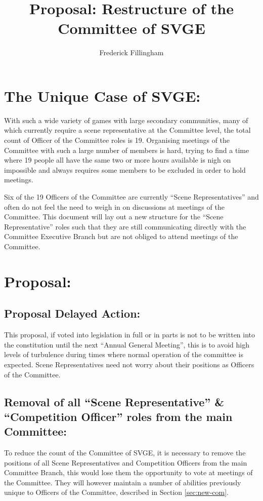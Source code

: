 \documentclass[10pt, a4paper]{article}
\title{Proposal: Restructure of the Committee of SVGE}
\author{Frederick Fillingham}
\begin{document}
\maketitle

\section{The Unique Case of SVGE:}
With such a wide variety of games with large secondary communities, many of which currently require a scene representative at the Committee level, the total count of Officer of the Committee roles is 19. Organising meetings of the Committee with such a large number of members is hard, trying to find a time where 19 people all have the same two or more hours available is nigh on impossible and always requires some members to be excluded in order to hold meetings. 

Six of the 19 Officers of the Committee are currently ``Scene Representatives'' and often do not feel the need to weigh in on discussions at meetings of the Committee. This document will lay out a new structure for the ``Scene Representative'' roles such that they are still communicating directly with the Committee Executive Branch but are not obliged to attend meetings of the Committee.


\section{Proposal:}

\subsection{Proposal Delayed Action: \label{sec:pda}}
This proposal, if voted into legislation in full or in parts is not to be written into the constitution until the next ``Annual General Meeting'', this is to avoid high levels of turbulence during times where normal operation of the committee is expected. Scene Representatives need not worry about their positions as Officers of the Committee.

\subsection{Removal of all ``Scene Representative'' \& ``Competition Officer'' roles from the main Committee: \label{sec:rem-scene-rep}}
To reduce the count of the Committee of SVGE, it is necessary to remove the positions of all Scene Representatives and Competition Officers from the main Committee Branch, this would lose them the opportunity to vote at meetings of the Committee. They will however maintain a number of abilities previously unique to Officers of the Committee, described in Section \ref{sec:new-com}.
\end{document}
